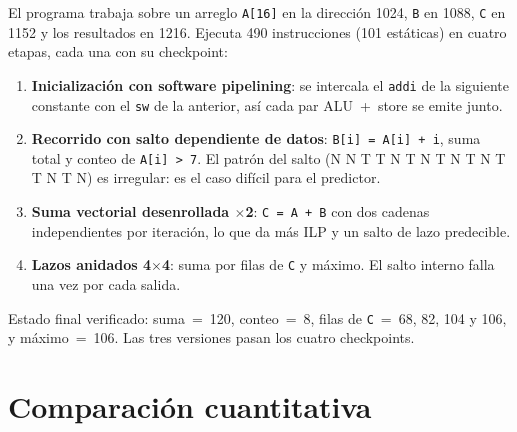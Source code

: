 \documentclass[11pt,a4paper]{article}
\newcommand{\sig}[1]{\texttt{#1}}
\begin{document}
El programa trabaja sobre un arreglo \sig{A[16]} en la dirección 1024, \sig{B} en 1088, \sig{C} en 1152 y los resultados en 1216. Ejecuta 490 instrucciones (101 estáticas) en cuatro etapas, cada una con su checkpoint:

\begin{enumerate}[nosep]
  \item \textbf{Inicialización con software pipelining}: se intercala el \sig{addi} de la siguiente constante con el \sig{sw} de la anterior, así cada par ALU~+~store se emite junto.
  \item \textbf{Recorrido con salto dependiente de datos}: \sig{B[i]~=~A[i]~+~i}, suma total y conteo de \sig{A[i]~>~7}. El patrón del salto (N N T T N T N T N T N T T N T N) es irregular: es el caso difícil para el predictor.
  \item \textbf{Suma vectorial desenrollada $\times$2}: \sig{C~=~A~+~B} con dos cadenas independientes por iteración, lo que da más ILP y un salto de lazo predecible.
  \item \textbf{Lazos anidados 4$\times$4}: suma por filas de \sig{C} y máximo. El salto interno falla una vez por cada salida.
\end{enumerate}

Estado final verificado: suma~=~120, conteo~=~8, filas de \sig{C}~=~68, 82, 104 y 106, y máximo~=~106. Las tres versiones pasan los cuatro checkpoints.

\section{Comparación cuantitativa}
\end{document}
